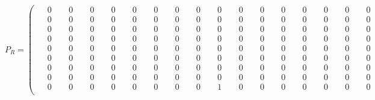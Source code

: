 \documentclass[10pt]{article}
\begin{document}
\[
P_R = \left(\begin{smallmatrix}
\phantom{-}0 & \phantom{-}0 & \phantom{-}0 & \phantom{-}0 & \phantom{-}0 & \phantom{-}0 & \phantom{-}0 & \phantom{-}0 & \phantom{-}0 & \phantom{-}0 & \phantom{-}0 & \phantom{-}0 & \phantom{-}0 & \phantom{-}0 & \phantom{-}0 & \phantom{-}0 \\
\phantom{-}0 & \phantom{-}0 & \phantom{-}0 & \phantom{-}0 & \phantom{-}0 & \phantom{-}0 & \phantom{-}0 & \phantom{-}0 & \phantom{-}0 & \phantom{-}0 & \phantom{-}0 & \phantom{-}0 & \phantom{-}0 & \phantom{-}0 & \phantom{-}0 & \phantom{-}0 \\
\phantom{-}0 & \phantom{-}0 & \phantom{-}0 & \phantom{-}0 & \phantom{-}0 & \phantom{-}0 & \phantom{-}0 & \phantom{-}0 & \phantom{-}0 & \phantom{-}0 & \phantom{-}0 & \phantom{-}0 & \phantom{-}0 & \phantom{-}0 & \phantom{-}0 & \phantom{-}0 \\
\phantom{-}0 & \phantom{-}0 & \phantom{-}0 & \phantom{-}0 & \phantom{-}0 & \phantom{-}0 & \phantom{-}0 & \phantom{-}0 & \phantom{-}0 & \phantom{-}0 & \phantom{-}0 & \phantom{-}0 & \phantom{-}0 & \phantom{-}0 & \phantom{-}0 & \phantom{-}0 \\
\phantom{-}0 & \phantom{-}0 & \phantom{-}0 & \phantom{-}0 & \phantom{-}0 & \phantom{-}0 & \phantom{-}0 & \phantom{-}0 & \phantom{-}0 & \phantom{-}0 & \phantom{-}0 & \phantom{-}0 & \phantom{-}0 & \phantom{-}0 & \phantom{-}0 & \phantom{-}0 \\
\phantom{-}0 & \phantom{-}0 & \phantom{-}0 & \phantom{-}0 & \phantom{-}0 & \phantom{-}0 & \phantom{-}0 & \phantom{-}0 & \phantom{-}0 & \phantom{-}0 & \phantom{-}0 & \phantom{-}0 & \phantom{-}0 & \phantom{-}0 & \phantom{-}0 & \phantom{-}0 \\
\phantom{-}0 & \phantom{-}0 & \phantom{-}0 & \phantom{-}0 & \phantom{-}0 & \phantom{-}0 & \phantom{-}0 & \phantom{-}0 & \phantom{-}0 & \phantom{-}0 & \phantom{-}0 & \phantom{-}0 & \phantom{-}0 & \phantom{-}0 & \phantom{-}0 & \phantom{-}0 \\
\phantom{-}0 & \phantom{-}0 & \phantom{-}0 & \phantom{-}0 & \phantom{-}0 & \phantom{-}0 & \phantom{-}0 & \phantom{-}0 & \phantom{-}0 & \phantom{-}0 & \phantom{-}0 & \phantom{-}0 & \phantom{-}0 & \phantom{-}0 & \phantom{-}0 & \phantom{-}0 \\
\phantom{-}0 & \phantom{-}0 & \phantom{-}0 & \phantom{-}0 & \phantom{-}0 & \phantom{-}0 & \phantom{-}0 & \phantom{-}0 & \phantom{-}1 & \phantom{-}0 & \phantom{-}0 & \phantom{-}0 & \phantom{-}0 & \phantom{-}0 & \phantom{-}0 & \phantom{-}0 \\

\end{smallmatrix}\]
\end{document}
